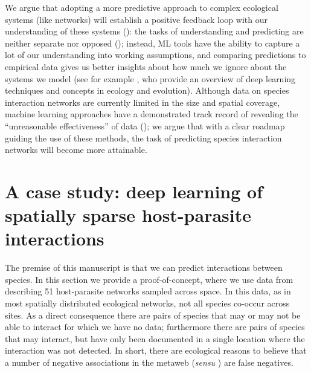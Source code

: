 \begin{refsection}
We argue that adopting a more predictive approach to complex ecological
systems (like networks) will establish a positive feedback loop with our
understanding of these systems (\cite{Houlahan2017PriPre}): the tasks of
understanding and predicting are neither separate nor opposed
(\cite{Maris2017PreEco}); instead, ML tools have the ability to capture a
lot of our understanding into working assumptions, and comparing
predictions to empirical data gives us better insights about how much we
ignore about the systems we model (see for example
\cite{Borowiec2021DeeLea}, who provide an overview of deep learning techniques
and concepts in ecology and evolution). Although data on species
interaction networks are currently limited in the size and spatial
coverage, machine learning approaches have a demonstrated track record
of revealing the ``unreasonable effectiveness'' of data
(\cite{Halevy2009Unreasonable}); we argue that with a clear roadmap guiding the
use of these methods, the task of predicting species interaction
networks will become more attainable.

\section{A case study: deep learning of spatially sparse host-parasite
interactions}\label{a-case-study-deep-learning-of-spatially-sparse-host-parasite-interactions}

The premise of this manuscript is that we can predict interactions
between species. In this section we provide a proof-of-concept, where we
use data from \cite{Hadfield2014TalTwo} describing 51 host-parasite networks
sampled across space. In this data, as in most spatially distributed
ecological networks, not all species co-occur across sites. As a direct
consequence there are pairs of species that may or may not be able to
interact for which we have no data; furthermore there are pairs of
species that may interact, but have only been documented in a single
location where the interaction was not detected. In short, there are
ecological reasons to believe that a number of negative associations in
the metaweb (\emph{sensu} \cite{Dunne2006Network}) are false negatives.


\end{refsection}
